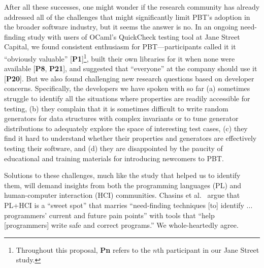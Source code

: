 \newcommand{\participant}[1]{{\bf P#1}}

After all these successes, one might wonder if the research community has already
addressed all of the challenges that might significantly limit PBT's adoption
in the broader software industry, but it
seems the answer is no.
In an ongoing need-finding study with users of OCaml's QuickCheck testing tool
at Jane Street Capital, we found
consistent enthusiasm for PBT---participants called it it
``obviously valuable'' [\participant{1}]\footnote{Throughout this proposal,
\participant{n} refers to the $n$th participant in our Jane Street study.},
built their own libraries for it when none were available [\participant{8},
\participant{21}], and suggested that ``everyone'' at the company should use it
[\participant{20}]. But we also found
challenging new research questions based on developer concerns.
Specifically, the developers we have spoken with so far
%
(a) sometimes struggle
to identify all the situations where properties are readily accessible for
testing,
%
(b) they complain that it
is sometimes difficult to write random generators for data structures
with complex invariants or to tune generator distributions to
adequately explore the space of interesting test cases,
%
(c) they find
it hard to understand whether their properties and generators are
effectively testing their software, and
%
(d) they are disappointed by
the paucity of educational and training materials for introducing
newcomers to PBT.\iflater{}\fi

Solutions to these challenges, much like the study that helped us to
identify them, will demand insights from both the programming languages (PL) and
human-computer interaction (HCI) communities.  Chasins et
al.~\cite{chasins_pl_2021} argue that PL+HCI is a ``sweet spot'' that marries
``need-finding techniques [to] identify ...  programmers' current and future
pain points'' with tools that ``help [programmers] write safe and correct
programs.'' We whole-heartedly agree.

